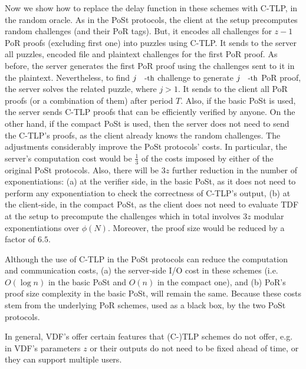 Now we show how to replace the delay function in these schemes with C-TLP, in the random oracle.  As in the PoSt protocols, the client at the setup precomputes random challenges (and their PoR tags). But, it encodes all challenges for $z-1$ PoR proofs (excluding first one)  into puzzles using C-TLP. It sends to the server all puzzles, encoded file and plaintext challenges for the first PoR proof. As before, the server generates the first PoR proof using the challenges sent to it in the plaintext. Nevertheless, to find $j\text{\small{-th}}$ challenge to generate  $j\text{\small{-th}}$ PoR proof, the server solves the related puzzle, where $j>1$. It sends to the client all PoR proofs (or a combination of them) after period $T$. Also, if the basic PoSt  is used,  the server sends C-TLP proofs that can be efficiently verified by anyone. On the other hand, if the compact PoSt is used, then the server does not need to send the C-TLP's proofs, as the client already knows the random challenges. The adjustments considerably improve the PoSt protocols' costs. In particular,  the server's computation cost would be $\frac{1}{3}$ of the costs imposed by either of the original PoSt protocols. Also,  there will be $3z$ further reduction in the number of exponentiations:  (a) at the verifier side, in the basic PoSt, as it does not need to perform any exponentiation to check the correctness of C-TLP's output,  (b) at the client-side, in the compact PoSt,  as the client does not need to evaluate TDF at the setup to precompute the challenges which in total involves $3z$ modular exponentiations over $\phi(N)$. Moreover, the proof size would be reduced by a factor of $6.5$.

\begin{remark}
Although the use of C-TLP in the PoSt protocols can reduce the computation and communication costs, (a) the server-side I/O cost in these schemes (i.e. $O(\log n)$ in the basic PoSt and $O(n)$ in the compact one), and (b) PoR's proof size complexity in the basic PoSt, will remain the same. Because these costs stem from the underlying PoR schemes, used as a black box, by the two PoSt protocols.
\end{remark}

\begin{remark}
In general, VDF's offer certain features that (C-)TLP schemes do not offer, e.g. in VDF's parameters $z$  or their outputs do not need to be fixed ahead of time, or they can support multiple users. 
\end{remark}